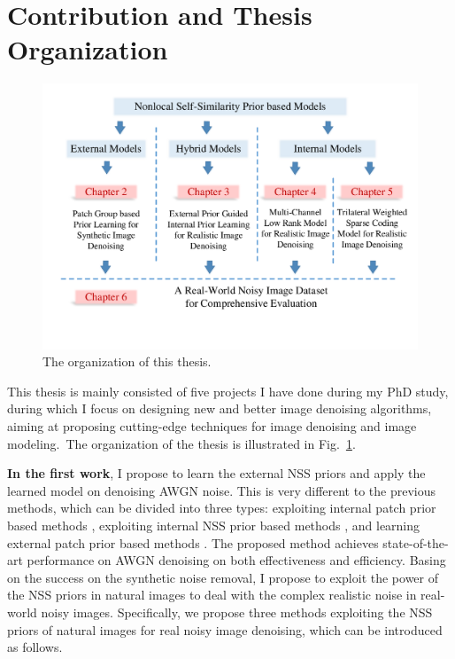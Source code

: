 \section{Contribution and Thesis Organization}
\label{sec:intro:new}
\begin{figure}
\centering
\includegraphics[width=1\linewidth]{images/ThesisOrganization.pdf}
\caption{The organization of this thesis.}
\label{fig1-1}
\end{figure}

This thesis is mainly consisted of five projects I have done during my PhD study, during which I focus on designing new and better image denoising algorithms, aiming at proposing cutting-edge techniques for image denoising and image modeling.\ The organization of the thesis is illustrated in Fig.\ \ref{fig1-1}.

\textbf{In the first work}, I propose to learn the external NSS priors and apply the learned model on denoising AWGN noise. This is very different to the previous methods, which can be divided into three types: exploiting internal patch prior based methods \cite{ksvd,ple}, exploiting internal NSS prior based methods \cite{bm3d,lssc,ncsr,wnnm}, and learning external patch prior based methods \cite{epll}. The proposed method achieves state-of-the-art performance on AWGN denoising on both effectiveness and efficiency. Basing on the success on the synthetic noise removal, I propose to exploit the power of the NSS priors in natural images to deal with the complex realistic noise in real-world noisy images. Specifically, we propose three methods exploiting the NSS priors of natural images for real noisy image denoising, which can be introduced as follows.


